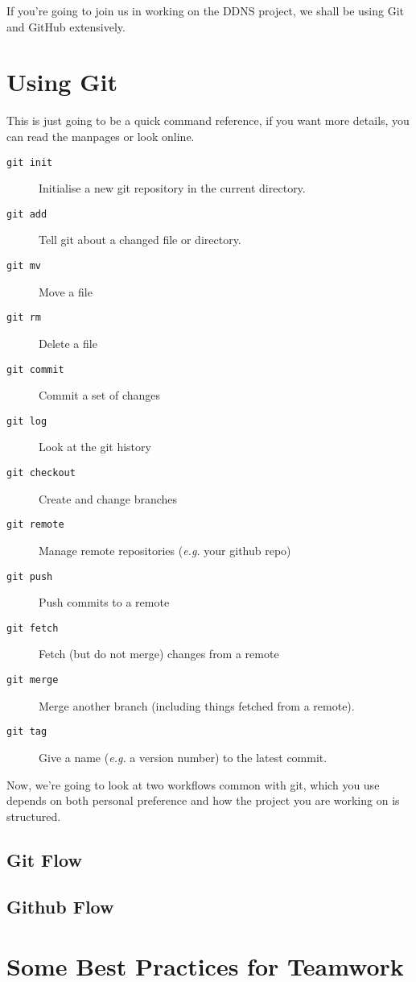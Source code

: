 \documentclass[12pt,a4paper]{article}
\begin{document}
If you're going to join us in working on the DDNS project, we shall be
using Git and GitHub extensively.

\pagebreak
\section{Using Git}

This is just going to be a quick command reference, if you want more
details, you can read the manpages or look online.

\begin{description}
  \item[\texttt{git init}] Initialise a new git repository in the
    current directory.
  \item[\texttt{git add}] Tell git about a changed file or directory.
  \item[\texttt{git mv}] Move a file
  \item[\texttt{git rm}] Delete a file
  \item[\texttt{git commit}] Commit a set of changes
  \item[\texttt{git log}] Look at the git history
  \item[\texttt{git checkout}] Create and change branches
  \item[\texttt{git remote}] Manage remote repositories
    (\textit{e.g.} your github repo)
  \item[\texttt{git push}] Push commits to a remote
  \item[\texttt{git fetch}] Fetch (but do not merge) changes from a
    remote
  \item[\texttt{git merge}] Merge another branch (including things
    fetched from a remote).
  \item[\texttt{git tag}] Give a name (\textit{e.g.} a version
    number) to the latest commit.
\end{description}

Now, we're going to look at two workflows common with git, which you
use depends on both personal preference and how the project you are
working on is structured.

\subsection{Git Flow}

\subsection{Github Flow}

\section{Some Best Practices for Teamwork}
\end{document}
